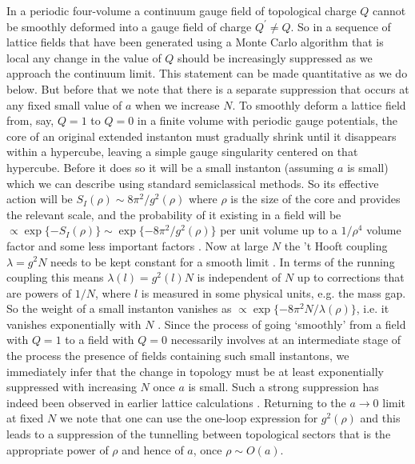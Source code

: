 \documentclass[12pt]{article}
\begin{document}
  
In a periodic four-volume a continuum gauge field of topological charge $Q$ cannot be smoothly
deformed into a gauge field of charge $Q^\prime\neq Q$. So in a sequence of lattice fields
that have been generated using a Monte Carlo algorithm that is local any change in
the value of $Q$ should be increasingly suppressed as we approach the continuum limit.
This statement can be made quantitative as we do below. But before that we note that
there is a separate suppression that occurs at any fixed small value of $a$
when we increase $N$. To smoothly deform a lattice field from, say, $Q=1$ to $Q=0$
in a finite volume with periodic gauge potentials, the core of an original
extended instanton must gradually shrink until it disappears within a hypercube,
leaving a simple gauge singularity centered on that hypercube.
Before it does so it will be a small instanton (assuming $a$ is small) which
we can describe using standard semiclassical methods. So its effective action 
will be $S_I(\rho) \sim 8\pi^2/g^2(\rho)$ where $\rho$ is the size of the core
and provides the relevant scale, and the probability of it existing
in a field will be $\propto \exp\{-S_I(\rho)\} \sim \exp\{- 8\pi^2/g^2(\rho)\}$
per unit volume up to a $1/\rho^4$ volume factor and some less important factors
%
\cite{tHooft_Q,Coleman_Q}.
%
Now at large $N$ the 't Hooft coupling $\lambda = g^2N$ needs to be kept constant
for a smooth limit
%
\cite{tHooft_N,Coleman_N}.
%
In terms of the running coupling this means $\lambda(l) = g^2(l)N$
is independent of $N$ up to corrections
that are powers of $1/N$, where $l$ is measured in some physical units, e.g.
the mass gap. So the weight of a small instanton vanishes as
$\propto \exp\{- 8\pi^2N/\lambda(\rho)\}$, i.e. it vanishes exponentially
with $N$
%
\cite{Witten_Q,Teper_Q}.
%
Since the process of going `smoothly' from a field with $Q=1$ to a field with
$Q=0$ necessarily involves at an intermediate stage of the process the presence of
fields containing such small instantons, we immediately infer that the change in
topology must be at least exponentially suppressed with increasing $N$ once $a$ is small.
Such a strong suppression has indeed been observed in earlier lattice calculations
%
\cite{BLMT_N,LDD_K2}.
%
Returning to the $a\to 0$ limit at fixed $N$ we note that one can use the one-loop expression
for $g^2(\rho)$ and this leads to a suppression of the tunnelling between
topological sectors that is the appropriate power of $\rho$ and hence of $a$, once
$\rho \sim O(a)$.
\end{document}
